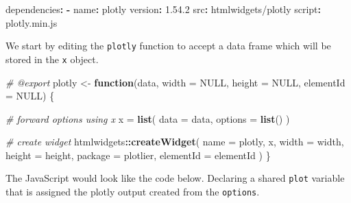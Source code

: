 \documentclass[
]{krantz}
\makeatletter
\newenvironment{Shaded}{\begin{snugshade}}{\end{snugshade}}
\newcommand{\AttributeTok}[1]{\textcolor[rgb]{0.61,0.61,0.61}{#1}}
\newcommand{\CommentTok}[1]{\textcolor[rgb]{0.37,0.37,0.37}{\textit{#1}}}
\newcommand{\ControlFlowTok}[1]{\textcolor[rgb]{0.27,0.27,0.27}{\textbf{#1}}}
\newcommand{\DataTypeTok}[1]{\textcolor[rgb]{0.27,0.27,0.27}{#1}}
\newcommand{\FloatTok}[1]{\textcolor[rgb]{0.06,0.06,0.06}{#1}}
\newcommand{\FunctionTok}[1]{\textcolor[rgb]{0,0,0}{#1}}
\newcommand{\KeywordTok}[1]{\textcolor[rgb]{0.27,0.27,0.27}{\textbf{#1}}}
\newcommand{\NormalTok}[1]{#1}
\newcommand{\OperatorTok}[1]{\textcolor[rgb]{0.43,0.43,0.43}{\textbf{#1}}}
\newcommand{\OtherTok}[1]{\textcolor[rgb]{0.37,0.37,0.37}{#1}}
\newcommand{\StringTok}[1]{\textcolor[rgb]{0.5,0.5,0.5}{#1}}
\newenvironment{kframe}{%
\medskip{}
\setlength{\fboxsep}{.8em}
 \def\at@end@of@kframe{}%
 \ifinner\ifhmode%
  \def\at@end@of@kframe{\end{minipage}}%
  \begin{minipage}{\columnwidth}%
 \fi\fi%
 \def\FrameCommand##1{\hskip\@totalleftmargin \hskip-\fboxsep
 \colorbox{shadecolor}{##1}\hskip-\fboxsep
     \hskip-\linewidth \hskip-\@totalleftmargin \hskip\columnwidth}%
 \MakeFramed {\advance\hsize-\width
   \@totalleftmargin\z@ \linewidth\hsize
   \@setminipage}}%
 {\par\unskip\endMakeFramed%
 \at@end@of@kframe}
\renewenvironment{Shaded}{\begin{kframe}}{\end{kframe}}
\makeatother
\begin{document}
\begin{Shaded}
\begin{Highlighting}[]
\FunctionTok{dependencies}\KeywordTok{:}
\AttributeTok{ }\KeywordTok{{-}}\AttributeTok{ }\FunctionTok{name}\KeywordTok{:}\AttributeTok{ plotly}
\AttributeTok{   }\FunctionTok{version}\KeywordTok{:}\AttributeTok{ }\FloatTok{1.54.2}
\AttributeTok{   }\FunctionTok{src}\KeywordTok{:}\AttributeTok{ htmlwidgets/plotly}
\AttributeTok{   }\FunctionTok{script}\KeywordTok{:}\AttributeTok{ plotly.min.js}
\end{Highlighting}
\end{Shaded}

We start by editing the \texttt{plotly} function to accept a data frame which will be stored in the \texttt{x} object.

\begin{Shaded}
\begin{Highlighting}[]
\CommentTok{\#\textquotesingle{} @export}
\NormalTok{plotly <{-}}\StringTok{ }\ControlFlowTok{function}\NormalTok{(data, }\DataTypeTok{width =} \OtherTok{NULL}\NormalTok{, }\DataTypeTok{height =} \OtherTok{NULL}\NormalTok{, }\DataTypeTok{elementId =} \OtherTok{NULL}\NormalTok{) \{}

  \CommentTok{\# forward options using x}
\NormalTok{  x =}\StringTok{ }\KeywordTok{list}\NormalTok{(}
    \DataTypeTok{data =}\NormalTok{ data,}
    \DataTypeTok{options =} \KeywordTok{list}\NormalTok{()}
\NormalTok{  )}

  \CommentTok{\# create widget}
\NormalTok{  htmlwidgets}\OperatorTok{::}\KeywordTok{createWidget}\NormalTok{(}
    \DataTypeTok{name =} \StringTok{\textquotesingle{}plotly\textquotesingle{}}\NormalTok{,}
\NormalTok{    x,}
    \DataTypeTok{width =}\NormalTok{ width,}
    \DataTypeTok{height =}\NormalTok{ height,}
    \DataTypeTok{package =} \StringTok{\textquotesingle{}plotlier\textquotesingle{}}\NormalTok{,}
    \DataTypeTok{elementId =}\NormalTok{ elementId}
\NormalTok{  )}
\NormalTok{\}}
\end{Highlighting}
\end{Shaded}

The JavaScript would look like the code below. Declaring a shared \texttt{plot} variable that is assigned the plotly output created from the \texttt{options}.
\end{document}
